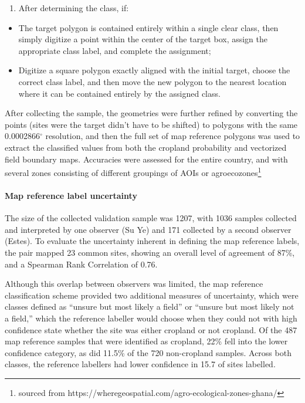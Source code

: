 \documentclass[
  11pt,
  a4paper]{article}
\providecommand{\tightlist}{%
  \setlength{\itemsep}{0pt}\setlength{\parskip}{0pt}}
\begin{document}
\begin{enumerate}
\def\labelenumi{\arabic{enumi}.}
\setcounter{enumi}{1}
\tightlist
\item
  After determining the class, if:
\end{enumerate}

\begin{itemize}
\tightlist
\item
  The target polygon is contained entirely within a single clear class,
  then simply digitize a point within the center of the target box,
  assign the appropriate class label, and complete the assignment;
\item
  Digitize a square polygon exactly aligned with the initial target,
  choose the correct class label, and then move the new polygon to the
  nearest location where it can be contained entirely by the assigned
  class.
\end{itemize}

After collecting the sample, the geometries were further refined by
converting the points (sites were the target didn't have to be shifted)
to polygons with the same 0.0002866\(^\circ\) resolution, and then the
full set of map reference polygons was used to extract the classified
values from both the cropland probability and vectorized field boundary
maps. Accuracies were assessed for the entire country, and with several
zones consisting of different groupings of AOIs or
agroecozones\footnote{sourced from https://wheregeospatial.com/agro-ecological-zones-ghana/}

\hypertarget{map-reference-label-uncertainty}{%
\paragraph{Map reference label
uncertainty}\label{map-reference-label-uncertainty}}

The size of the collected validation sample was 1207, with 1036 samples
collected and interpreted by one observer (Su Ye) and 171 collected by a
second observer (Estes). To evaluate the uncertainty inherent in
defining the map reference labels, the pair mapped 23 common sites,
showing an overall level of agreement of 87\%, and a Spearman Rank
Correlation of 0.76.

Although this overlap between observers was limited, the map reference
classification scheme provided two additional measures of uncertainty,
which were classes defined as ``unsure but most likely a field'' or
``unsure but most likely not a field,'' which the reference labeller
would choose when they could not with high confidence state whether the
site was either cropland or not cropland. Of the 487 map reference
samples that were identified as cropland, 22\% fell into the lower
confidence category, as did 11.5\% of the 720 non-cropland samples.
Across both classes, the reference labellers had lower confidence in
15.7 of sites labelled.
\end{document}
